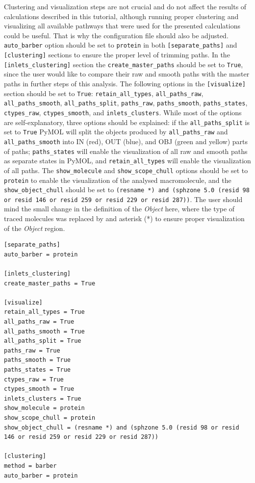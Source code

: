 \documentclass[9pt,tutorial, pubversion]{livecoms}
\begin{document}
Clustering and visualization steps are not crucial and do not affect the results of calculations described in this tutorial, although running proper clustering and visualizing all available pathways that were used for the presented calculations could be useful. That is why the configuration file should also be adjusted. \texttt{auto\_barber} option should be set to \texttt{protein} in both \texttt{[separate\_paths]} and \texttt{[clustering]} sections to ensure the proper level of trimming paths. In the \texttt{[inlets\_clustering]} section the \texttt{create\_master\_paths} should be set to \texttt{True}, since the user would like to compare their raw and smooth paths with the master paths in further steps of this analysis. The following options in the \texttt{[visualize]} section should be set to \texttt{True}: \texttt{retain\_all\_types}, \texttt{all\_paths\_raw}, \texttt{all\_paths\_smooth}, \texttt{all\_paths\_split}, \texttt{paths\_raw}, \texttt{paths\_smooth}, \texttt{paths\_states}, \texttt{ctypes\_raw}, \texttt{ctypes\_smooth},  and \texttt{inlets\_clusters}. While most of the options are self-explanatory, three options should be explained: if the \texttt{all\_paths\_split} is set to \texttt{True} PyMOL will split the objects produced by \texttt{all\_paths\_raw} and \texttt{all\_paths\_smooth} into IN (red), OUT (blue), and OBJ (green and yellow) parts of paths; \texttt{paths\_states} will enable the visualization of all raw and smooth paths as separate states in PyMOL, and \texttt{retain\_all\_types} will enable the visualization of all paths. The \texttt{show\_molecule} and \texttt{show\_scope\_chull} options should be set to \texttt{protein} to enable the visualization of the analysed macromolecule, and the \texttt{show\_object\_chull} should be set to \texttt{(resname *) and (sphzone 5.0 (resid 98 or resid 146 or resid 259 or resid 229 or resid 287))}. The user should mind the small change in the definition of the \textit{Object} here, where the type of traced molecules was replaced by and asterisk (*) to ensure proper visualization of the \textit{Object} region.

\begin{lstlisting}
[separate_paths]
auto_barber = protein

[inlets_clustering]
create_master_paths = True

[visualize]
retain_all_types = True
all_paths_raw = True
all_paths_smooth = True
all_paths_split = True
paths_raw = True
paths_smooth = True
paths_states = True
ctypes_raw = True
ctypes_smooth = True
inlets_clusters = True
show_molecule = protein
show_scope_chull = protein
show_object_chull = (resname *) and (sphzone 5.0 (resid 98 or resid 146 or resid 259 or resid 229 or resid 287))

[clustering]
method = barber
auto_barber = protein
\end{lstlisting}
\end{document}
